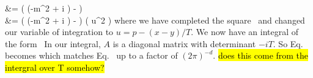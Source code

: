 \documentclass[11pt]{article}
\begin{document}
{{		&= \int \ddT \exp(  (-m^2 + i \eps) -  ) \intnii \dddp {} \notag \\
		&= \int \ddT \exp(  (-m^2 + i \eps) -  ) \intnii \dddu \exp(  u^2 ) \label{thing1a3}
	}
	where we have completed the square~\cite[p.~282]{Peskin} and changed our variable of integration to $u = p - (x - y) / T$.  We now have an integral of the form~\cite{QFT}
	In our integral, $A$ is a diagonal matrix with determinant $-i T$.  So Eq.~ becomes
	which matches Eq.~ up to a factor of $(2\pi)^{-d}$.  \hl{does this come from the intergral over T somehow?}
}


\clearpage
{}
\end{document}
